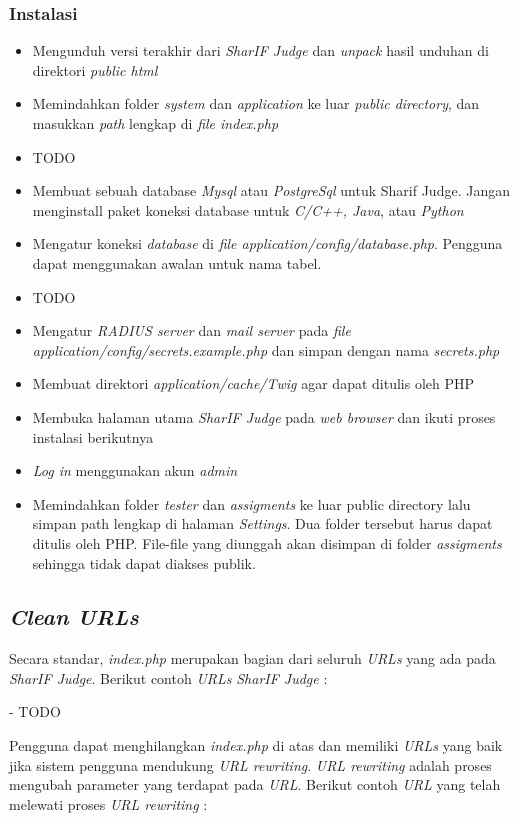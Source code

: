 \subsubsection{Instalasi}
\begin{itemize}
	\item Mengunduh versi terakhir dari \textit{SharIF Judge} dan \textit{unpack} hasil unduhan di direktori \textit{public html}
	\item Memindahkan folder \textit{system} dan \textit{application} ke luar \textit{public directory}, dan masukkan \textit{path} lengkap di \textit{file index.php}
	\item TODO
	\item Membuat sebuah database \textit{Mysql} atau \textit{PostgreSql} untuk Sharif Judge. Jangan menginstall paket koneksi database untuk \textit{C/C++, Java}, atau \textit{Python}
	\item Mengatur koneksi \textit{database} di \textit{file application/config/database.php}. Pengguna dapat
	menggunakan awalan untuk nama tabel.
	\item TODO
	\item Mengatur \textit{RADIUS server} dan \textit{mail server} pada \textit{file application/config/secrets.example.php} dan simpan dengan nama \textit{secrets.php}
	\item Membuat direktori \textit{application/cache/Twig} agar dapat ditulis oleh PHP
	\item Membuka halaman utama \textit{SharIF Judge} pada \textit{web browser} dan ikuti proses instalasi berikutnya
	\item \textit{Log in} menggunakan akun \textit{admin}
	\item Memindahkan folder \textit{tester} dan \textit{assigments} ke luar public directory lalu simpan path lengkap di halaman \textit{Settings}. Dua folder tersebut harus dapat ditulis oleh PHP. File-file yang diunggah
	akan disimpan di folder \textit{assigments} sehingga tidak dapat diakses publik.
\end{itemize}

\subsection{\textit{Clean URLs}}
Secara standar, \textit{index.php} merupakan bagian dari seluruh \textit{URLs} yang ada pada \textit{SharIF Judge}. Berikut contoh \textit{URLs} \textit{SharIF Judge} :

- TODO

Pengguna dapat menghilangkan \textit{index.php} di atas dan memiliki \textit{URLs} yang baik jika sistem pengguna mendukung \textit{URL rewriting}. \textit{URL rewriting} adalah proses mengubah parameter yang terdapat pada \textit{URL}. Berikut contoh \textit{URL} yang telah melewati proses \textit{URL rewriting} :

